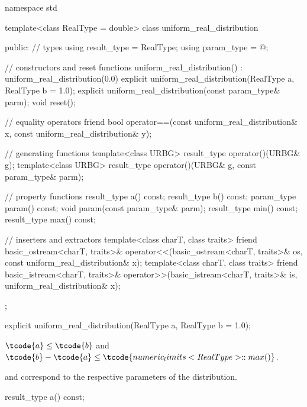 %
%
\begin{codeblock}
namespace std {
  template<class RealType = double>
  class uniform_real_distribution {
  public:
    // types
    using result_type = RealType;
    using param_type  = @\unspec@;

    // constructors and reset functions
    uniform_real_distribution() : uniform_real_distribution(0.0) {}
    explicit uniform_real_distribution(RealType a, RealType b = 1.0);
    explicit uniform_real_distribution(const param_type& parm);
    void reset();

    // equality operators
    friend bool operator==(const uniform_real_distribution& x,
                           const uniform_real_distribution& y);

    // generating functions
    template<class URBG>
      result_type operator()(URBG& g);
    template<class URBG>
      result_type operator()(URBG& g, const param_type& parm);

    // property functions
    result_type a() const;
    result_type b() const;
    param_type param() const;
    void param(const param_type& parm);
    result_type min() const;
    result_type max() const;

    // inserters and extractors
    template<class charT, class traits>
      friend basic_ostream<charT, traits>&
        operator<<(basic_ostream<charT, traits>& os, const uniform_real_distribution& x);
    template<class charT, class traits>
      friend basic_istream<charT, traits>&
        operator>>(basic_istream<charT, traits>& is, uniform_real_distribution& x);
  };
}
\end{codeblock}


%
\begin{itemdecl}
explicit uniform_real_distribution(RealType a, RealType b = 1.0);
\end{itemdecl}

\begin{itemdescr}
\pnum
\expects
$\tcode{a} \leq \tcode{b}$
and
$\tcode{b} - \tcode{a} \leq \tcode{numeric_limits<RealType>::max()}$.

\pnum
\remarks
  and 
 correspond to the respective parameters of the distribution.
\end{itemdescr}

%
\begin{itemdecl}
result_type a() const;
\end{itemdecl}

